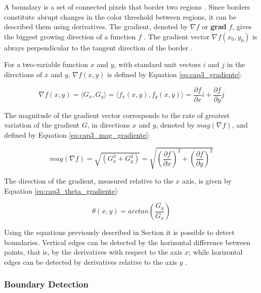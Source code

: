 A boundary is a set of connected pixels that border two regions \cite{gonzalez2002digital}.
Since borders constitute abrupt changes in the color threshold between regions, it can be described them using derivatives.
The gradient, denoted by $\nabla f$ or \textbf{grad} $f$, gives the biggest growing direction of a function $f$ \cite{stewart2003calculus}. 
The gradient vector $\nabla f(x_0 , y_0 )$ is always perpendicular to the tangent direction of the border \cite{stewart2003calculus}. %

For a two-variable function $x$ and $y$, with standard unit vectors $i$ and $j$ in the directions of $x$ and $y$, $\nabla f(x,y)$ is defined by Equation \ref{eq:cap3_gradiente}:

\begin{equation}
 \nabla f(x,y)= \langle G_x, G_y \rangle = \langle f_x (x,y), f_y (x,y) \rangle = \frac{\partial f}{\partial x}i + \frac{\partial f}{\partial y}j
 \label{eq:cap3_gradiente}
\end{equation}

The magnitude of the gradient vector corresponds to the rate of greatest variation of the gradient $G$, in directions $x$ and $y$, denoted by $mag(\nabla f)$, and defined by Equation \ref{eq:cap3_mag_gradiente}: 

\begin{equation}
 mag(\nabla f)= \sqrt{\left(G_x^2 + G_y^2 \right)} = \sqrt{ \left(\frac{\partial f}{\partial x} \right)^2 + \left(\frac{\partial f}{\partial y} \right)^2}
 \label{eq:cap3_mag_gradiente}
\end{equation}

The direction of the gradient, measured relative to the $x$ axis, is given by Equation \ref{eq:cap3_theta_gradiente}:

\begin{equation}
 \theta (x,y) = arctan \left(\frac{G_y}{G_x} \right)
 \label{eq:cap3_theta_gradiente}
\end{equation}

Using the equations previously described in Section it is possible to detect boundaries.
Vertical edges can be detected by the horizontal difference between points, that is, by the derivatives with respect to the axis $x$; while horizontal edges can be detected by derivatives relative to the axis $y$ \cite{pedrini2008analise}.

\subsubsection{Boundary Detection}
\label{cap3_boundary_detection}

